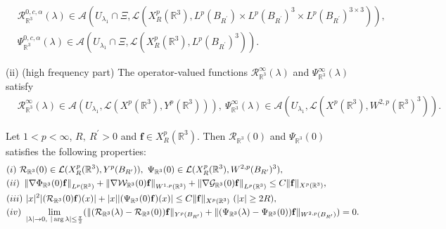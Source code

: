 \documentclass[10pt,a4paper]{amsart}
\begin{document}
\begin{prop}
\begin{align*}
&\mathcal{R}_{\mathbb{R}^3}^{0,c,\alpha}(\lambda)\in \mathcal{A}(U_{\lambda_1} \cap \Xi, \mathcal{L}(X_R^{p}(\mathbb{R}^3),L^{p}(B_{R^\prime})\times L^{p}(B_{R^\prime})^3 \times L^{p}(B_{R^\prime})^{3\times3} )),\\
&\Psi_{\mathbb{R}^3}^{0,c,\alpha}(\lambda)\in \mathcal{A}(U_{\lambda_1} \cap \Xi, \mathcal{L}(X_R^{p}(\mathbb{R}^3),L^{p}(B_{R^\prime})^3)).
\end{align*}

\vskip2mm
\noindent
{\rm (ii) (high frequency part)} The operator-valued functions $\mathcal{R}_{\mathbb{R}^3}^\infty(\lambda)$ and $\Psi_{\mathbb{R}^3}^\infty(\lambda)$ satisfy 
\begin{align*}
&\mathcal{R}_{\mathbb{R}^3}^\infty(\lambda)\in \mathcal{A}(U_{\lambda_1}, \mathcal{L}(X^p(\mathbb{R}^3),Y^p(\mathbb{R}^3))),
~\Psi_{\mathbb{R}^3}^\infty(\lambda)\in \mathcal{A}(U_{\lambda_1},\mathcal{L}(X^p(\mathbb{R}^3),W^{2,p}(\mathbb{R}^3)^3) ).
\end{align*}
\end{prop}

\begin{prop}\label{R-R3-prop3}
Let $1<p<\infty$, $R,~R^\prime>0$ and $\mathbf{f}\in X_R^p(\mathbb{R}^3)$. Then $\mathcal{R}_{\mathbb{R}^3}(0)$ and $\Psi_{\mathbb{R}^3}(0)$ satisfies the following properties:
\begin{align}
&{\rm (i)}~\mathcal{R}_{\mathbb{R}^3}(0)\in \mathcal{L}(X_R^p(\mathbb{R}^3),Y^p(B_{R^\prime})),~\Psi_{\mathbb{R}^3}(0)\in \mathcal{L}(X_R^p(\mathbb{R}^3),W^{2,p}(B_{R^\prime})^3), \label{R-R3-prop3-1} \\
&{\rm (ii)}~ 
\left\|\nabla \Phi_{\mathbb{R}^3}(0)\mathbf{f}\right\|_{L^p(\mathbb{R}^3)}+\left\|\nabla \mathcal{W}_{\mathbb{R}^3}(0)\mathbf{f}\right\|_{W^{1,p}(\mathbb{R}^3)}+\left\|\nabla \mathcal{G}_{\mathbb{R}^3}(0)\mathbf{f}\right\|_{L^p(\mathbb{R}^3)}
\leq 
C\|\mathbf{f}\|_{X^p(\mathbb{R}^3)}, 
\label{R-R3-prop3-2}
\\
&{\rm (iii)}~
 |x|^2|(\mathcal{R}_{\mathbb{R}^3}(0)\mathbf{f})(x)|+|x||(\Psi_{\mathbb{R}^3}(0)\mathbf{f})(x)|\leq C \|\mathbf{f}\|_{X^p(\mathbb{R}^3)}~(|x|\ge 2R), 
\label{R-R3-prop3-3} \\
&{\rm (iv)}~
\lim_{|\lambda|\to 0,~|\arg \lambda|\le \frac{\pi}{2}}(\|(\mathcal{R}_{\mathbb{R}^3}(\lambda)-\mathcal{R}_{\mathbb{R}^3}(0))\mathbf{f}\|_{Y^p(B_{R^\prime})}+\|(\Psi_{\mathbb{R}^3}(\lambda)-\Psi_{\mathbb{R}^3}(0))\mathbf{f}\|_{W^{2,p}(B_{R^\prime})})=0. \label{R-R3-prop3-4}
\end{align}
\end{prop}
\end{document}
